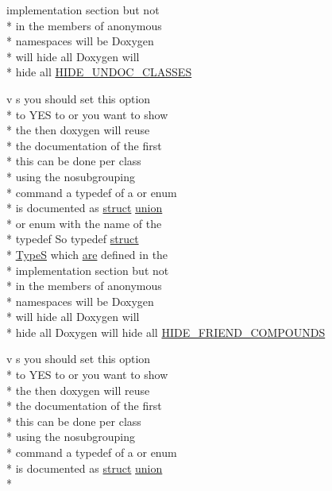 \begin{DoxyCompactItemize}
implementation section but not \\*
in the members of anonymous \\*
namespaces will be Doxygen \\*
will hide all Doxygen will \\*
hide all \hyperlink{mkdoc_8dox_a52efc4dfca6b18ed1ee0590d32cbbe76}{H\-I\-D\-E\-\_\-\-U\-N\-D\-O\-C\-\_\-\-C\-L\-A\-S\-S\-E\-S}
\item 
v s you should set this option \\*
to Y\-E\-S to or you want to show \\*
the then doxygen will reuse \\*
the documentation of the first \\*
this can be done per class \\*
using the nosubgrouping \\*
command a typedef of a or enum \\*
is documented as \hyperlink{mkdoc_8dox_aba655c5729da86df745f0c8e7f9ba8d2}{struct} \hyperlink{mkdoc_8dox_a68000add3c95d09ceb97c3079515907d}{union} \\*
or enum with the name of the \\*
typedef So typedef \hyperlink{mkdoc_8dox_aba655c5729da86df745f0c8e7f9ba8d2}{struct} \\*
\hyperlink{mkdoc_8dox_a25dd1c015abaf1e4f2c6879012f4f170}{Type\-S} which \hyperlink{mkdoc_8dox_a6d0965b20c4eb2235e8f9f5f0e5193ae}{are} defined in the \\*
implementation section but not \\*
in the members of anonymous \\*
namespaces will be Doxygen \\*
will hide all Doxygen will \\*
hide all Doxygen will hide all \hyperlink{mkdoc_8dox_a90cb1e2bfb8402bdac3320203fe5276a}{H\-I\-D\-E\-\_\-\-F\-R\-I\-E\-N\-D\-\_\-\-C\-O\-M\-P\-O\-U\-N\-D\-S}
\item 
v s you should set this option \\*
to Y\-E\-S to or you want to show \\*
the then doxygen will reuse \\*
the documentation of the first \\*
this can be done per class \\*
using the nosubgrouping \\*
command a typedef of a or enum \\*
is documented as \hyperlink{mkdoc_8dox_aba655c5729da86df745f0c8e7f9ba8d2}{struct} \hyperlink{mkdoc_8dox_a68000add3c95d09ceb97c3079515907d}{union} \\*

\end{DoxyCompactItemize}
